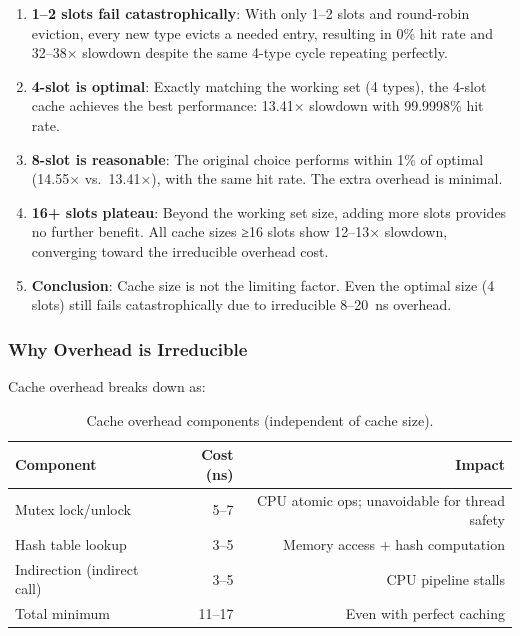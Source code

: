 \documentclass[sigplan,final]{acmart}
\begin{document}
\begin{enumerate}
  \item \textbf{1--2 slots fail catastrophically}: With only 1--2 slots and round-robin eviction,
    every new type evicts a needed entry, resulting in 0\% hit rate and 32--38× slowdown despite
    the same 4-type cycle repeating perfectly.

  \item \textbf{4-slot is optimal}: Exactly matching the working set (4 types), the 4-slot cache
    achieves the best performance: 13.41× slowdown with 99.9998\% hit rate.

  \item \textbf{8-slot is reasonable}: The original choice performs within 1\% of optimal
    (14.55× vs.~13.41×), with the same hit rate. The extra overhead is minimal.

  \item \textbf{16+ slots plateau}: Beyond the working set size, adding more slots provides no
    further benefit. All cache sizes ≥16 slots show 12--13× slowdown, converging toward the
    irreducible overhead cost.

  \item \textbf{Conclusion}: Cache size is not the limiting factor. Even the optimal size (4 slots)
    still fails catastrophically due to irreducible 8--20~ns overhead.
\end{enumerate}

\subsubsection{Why Overhead is Irreducible}

Cache overhead breaks down as:

\begin{table}[h]
\centering
\caption{Cache overhead components (independent of cache size).}
\label{tab:overhead-breakdown}
\begin{tabular}{@{}lrr@{}}
\toprule
\textbf{Component} & \textbf{Cost (ns)} & \textbf{Impact} \\
\midrule
Mutex lock/unlock & 5--7 & CPU atomic ops; unavoidable for thread safety \\
Hash table lookup & 3--5 & Memory access + hash computation \\
Indirection (indirect call) & 3--5 & CPU pipeline stalls \\
\midrule
Total minimum & 11--17 & Even with perfect caching \\
\bottomrule
\end{tabular}
\end{table}
\end{document}
